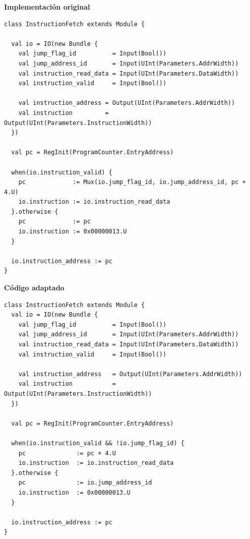 \begin{table}[p]
\centering

\textbf{Implementación original}

\begin{lstlisting}[style=scalaStyleNoNumbering,columns=fullflexible]
class InstructionFetch extends Module {

  val io = IO(new Bundle {
    val jump_flag_id          = Input(Bool())
    val jump_address_id       = Input(UInt(Parameters.AddrWidth))
    val instruction_read_data = Input(UInt(Parameters.DataWidth))
    val instruction_valid     = Input(Bool())

    val instruction_address = Output(UInt(Parameters.AddrWidth))
    val instruction         = Output(UInt(Parameters.InstructionWidth))
  })

  val pc = RegInit(ProgramCounter.EntryAddress)

  when(io.instruction_valid) {
    pc             := Mux(io.jump_flag_id, io.jump_address_id, pc + 4.U)
    io.instruction := io.instruction_read_data
  }.otherwise {
    pc             := pc
    io.instruction := 0x00000013.U
  }

  io.instruction_address := pc
}
\end{lstlisting}

\vspace{0.5cm}

\textbf{Código adaptado}

\begin{lstlisting}[style=scalaStyleNoNumbering,columns=fullflexible]
class InstructionFetch extends Module {
  val io = IO(new Bundle {
    val jump_flag_id          = Input(Bool())
    val jump_address_id       = Input(UInt(Parameters.AddrWidth))
    val instruction_read_data = Input(UInt(Parameters.DataWidth))
    val instruction_valid     = Input(Bool())

    val instruction_address   = Output(UInt(Parameters.AddrWidth))
    val instruction           = Output(UInt(Parameters.InstructionWidth))
  })

  val pc = RegInit(ProgramCounter.EntryAddress)

  when(io.instruction_valid && !io.jump_flag_id) {
    pc              := pc + 4.U
    io.instruction  := io.instruction_read_data
  }.otherwise {
    pc              := io.jump_address_id
    io.instruction  := 0x00000013.U
  }

  io.instruction_address := pc
}
\end{lstlisting}

\caption{Comparación entre la implementación original y la implementación adaptada del módulo \texttt{InstructionFetch}.}
\label{tab:instructionfetch-comparison}

\end{table}

